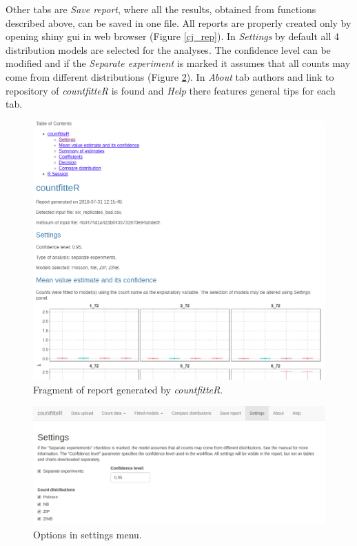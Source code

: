 Other tabs are \textit{Save report}, where all the results, obtained from functions described above, can be saved in one file. All reports are properly created only by opening shiny gui in web browser (Figure \ref{cj_rep}). In \textit{Settings} by default all 4 distribution models are selected for the analyses. The confidence level can be modified and if the \textit{Separate experiment} is marked it assumes that all counts may come from different distributions (Figure \ref{cj_set}). In \textit{About} tab authors and link to repository of \emph{countfitteR} is found and \textit{Help} there features general tips for each tab. 

\begin{figure}[htbp]
  \centering
  \includegraphics[width=0.99\columnwidth]{fig/cf_rep.png}
  \caption{Fragment of report generated by \emph{countfitteR}.}
  \label{cf_rep}
\end{figure}

\begin{figure}[htbp]
  \centering
  \includegraphics[width=0.99\columnwidth]{fig/cf_set.png}
  \caption{Options in settings menu.}
  \label{cj_set}
\end{figure}

